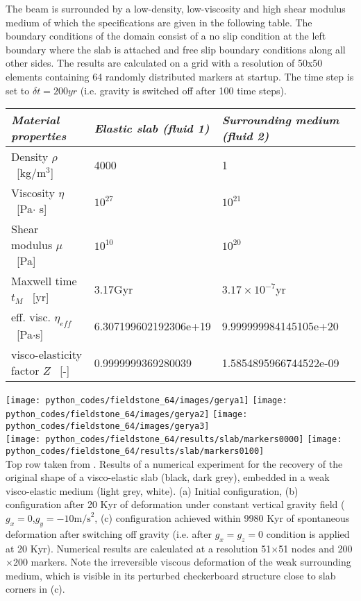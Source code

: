 The beam is surrounded by a low-density, low-viscosity and high shear modulus medium 
of which the specifications are given in  the following table.
The boundary conditions of the domain consist of a no slip condition at 
the left boundary where the slab is attached and free slip boundary conditions along all other sides. 
The results are calculated on a grid with a resolution of 50x50 elements containing 64 randomly 
distributed markers at startup.
The time step is set to $\delta t = 200yr$ (i.e. gravity is switched off after 100 time steps).

\begin{center}
\begin{tabular}{lll}
\hline 
\textit{Material properties}& \textit{Elastic slab (fluid 1)}  & \textit{Surrounding medium (fluid 2)} \\
\hline 
\hline 
Density         $\rho$ \     [kg/m$^{3}$]      & 4000                    & 1     \\
Viscosity       $\eta$ \    [Pa$\cdot$ s]      & $10^{27}$               &   $10^{21}$     \\
Shear modulus   $\mu $ \    [Pa]               & $10^{10}$               & $10^{20}$       \\
Maxwell time $t_M$     \    [yr]               & 3.17Gyr                 &  $3.17\times10^{-7}$yr       \\
eff. visc.      $\eta_{eff}$ \ [Pa$\cdot$s]    & 6.307199602192306e+19   &  9.999999984145105e+20      \\
visco-elasticity factor $Z$      \ [-]         & 0.9999999369280039      &  1.5854895966744522e-09     \\
\hline 
\end{tabular} 
\end{center}

\begin{center}
\texttt{[image: python\_codes/fieldstone\_64/images/gerya1]}
\texttt{[image: python\_codes/fieldstone\_64/images/gerya2]}
\texttt{[image: python\_codes/fieldstone\_64/images/gerya3]}\\
\texttt{[image: python\_codes/fieldstone\_64/results/slab/markers0000]}
\texttt{[image: python\_codes/fieldstone\_64/results/slab/markers0100]}\\
{\captionfont Top row taken from \cite[16.11]{gery10}. 
Results of a numerical experiment for the recovery of the original
shape of a visco-elastic slab (black, dark grey), 
 embedded in a weak visco-elastic medium (light grey, white). 
(a) Initial configuration, (b) configuration after 20 Kyr of deformation under 
constant vertical gravity field ($g_x=0$,$g_y =-10\text{m/s}^2$, 
(c) configuration achieved within 9980 Kyr of spontaneous deformation after 
switching off gravity (i.e. after $g_x=g_z=0$ condition is applied at
20 Kyr). Numerical results are calculated at a resolution 51$\times$51 nodes and
200$\times$200 markers. Note the irreversible viscous deformation of the weak surrounding medium,
which is visible in its perturbed checkerboard structure close to slab corners in (c).}
\end{center}

